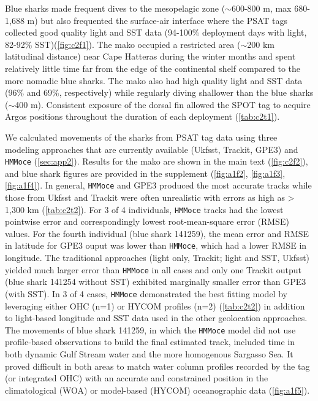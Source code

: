 Blue sharks made frequent dives to the mesopelagic zone
($\sim$600-800 m, max 680-1,688 m) but also frequented the
surface-air interface where the PSAT tags collected good quality light
and SST data (94-100\% deployment days with light, 82-92\% SST)(\cref{fig:c2f1}). The mako occupied a restricted area
($\sim$200 km latitudinal distance) near Cape Hatteras during
the winter months and spent relatively little time far from the edge of the continental shelf compared to the more nomadic blue sharks. The mako
also had high quality light and SST data (96\% and 69\%, respectively)
while regularly diving shallower than the blue sharks
($\sim$400 m). Consistent exposure of the dorsal fin allowed
the SPOT tag to acquire Argos positions throughout the duration of each
deployment (\cref{tab:c2t1}).

We calculated movements of the sharks from PSAT tag data using three
modeling approaches that are currently available (Ukfsst, Trackit, GPE3)
and \texttt{HMMoce} (\cref{sec:app2}). Results for the mako are shown in the
main text (\cref{fig:c2f2}), and blue shark figures are
provided in the supplement (\cref{fig:a1f2}, \cref{fig:a1f3}, \cref{fig:a1f4}). In general,
\texttt{HMMoce} and GPE3 produced the most accurate tracks while those
from Ukfsst and Trackit were often unrealistic with errors as high as
> 1,300 km (\cref{tab:c2t2}). For 3 of 4 individuals, \texttt{HMMoce}
tracks had the lowest pointwise error and correspondingly lowest
root-mean-square error (RMSE) values. For the fourth individual (blue
shark 141259), the mean error and RMSE in latitude for GPE3 ouput was
lower than \texttt{HMMoce}, which had a lower RMSE in longitude. The
traditional approaches (light only, Trackit; light and SST, Ukfsst)
yielded much larger error than \texttt{HMMoce} in all cases and only one
Trackit output (blue shark 141254 without SST) exhibited marginally
smaller error than GPE3 (with SST). In 3 of 4 cases, \texttt{HMMoce}
demonstrated the best fitting model by leveraging either OHC (n=1) or
HYCOM profiles (n=2) (\cref{tab:c2t2}) in addition to light-based longitude and
SST data used in the other geolocation approaches. The movements of blue
shark 141259, in which the \texttt{HMMoce} model did not use
profile-based observations to build the final estimated track, included
time in both dynamic Gulf Stream water and the more homogenous Sargasso
Sea. It proved difficult in both areas to match water column profiles
recorded by the tag (or integrated OHC) with an accurate and constrained
position in the climatological (WOA) or model-based (HYCOM)
oceanographic data (\cref{fig:a1f5}).

